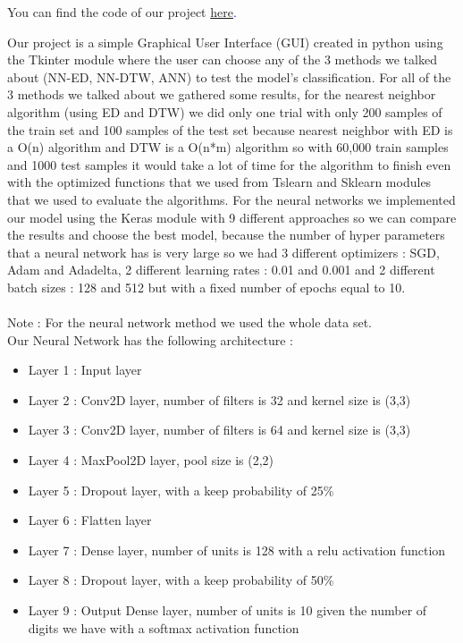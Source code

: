 \documentclass[10pt,a4paper]{article}
\begin{document}
You can find the code of our project \textcolor{blue}{\href{https://github.com/hadifawaz1999/Mini_Project}{here}.}

Our project is a simple Graphical User Interface (GUI) created in python using the Tkinter module where the user can choose any of the 3 methods we talked about (NN-ED, NN-DTW, ANN) to test the model's classification. For all of the 3 methods we talked about we gathered some results, for the nearest neighbor algorithm (using ED and DTW) we did only one trial with only 200 samples of the train set and 100 samples of the test set because nearest neighbor with ED is a O(n) algorithm and DTW is a O(n*m) algorithm so with 60,000 train samples and 1000 test samples it would take a lot of time for the algorithm to finish even with the optimized functions that we used from Tslearn and Sklearn modules that we used to evaluate the algorithms. For the neural networks we implemented our model using the Keras module with 9 different approaches so we can compare the results and choose the best model, because the number of hyper parameters that a neural network has is very large so we had 3 different optimizers : SGD, Adam and Adadelta, 2 different learning rates : 0.01 and 0.001 and 2 different batch sizes : 128 and 512 but with a fixed number of epochs equal to 10.\\\\
Note : For the neural network method we used the whole data set.\\
Our Neural Network has the following architecture :\\
\begin{itemize}
\item Layer 1 : Input layer
\item Layer 2 : Conv2D layer, number of filters is 32 and kernel size is (3,3)
\item Layer 3 : Conv2D layer, number of filters is 64 and kernel size is (3,3)
\item Layer 4 : MaxPool2D layer, pool size is (2,2)
\item Layer 5 : Dropout layer, with a keep probability of 25\%
\item Layer 6 : Flatten layer
\item Layer 7 : Dense layer, number of units is 128 with a relu activation function
\item Layer 8 : Dropout layer, with a keep probability of 50\%
\item Layer 9 : Output Dense layer, number of units is 10 given the number of digits we have with a softmax activation function
\end{itemize}
\end{document}
